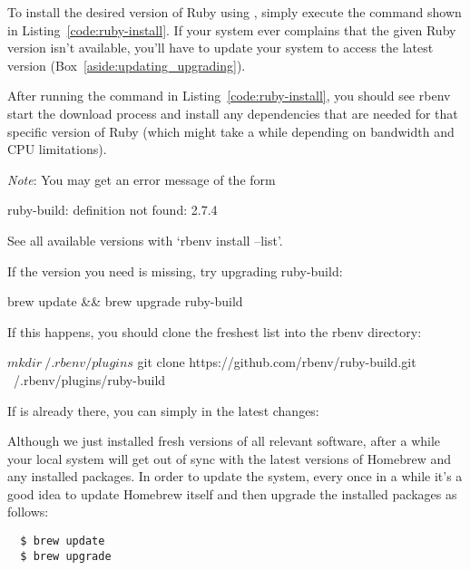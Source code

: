 To install the desired version of Ruby using , simply execute the command shown in Listing~\ref{code:ruby-install}. If your system ever complains that the given Ruby version isn't available, you'll have to update your system to access the latest version (Box~\ref{aside:updating_upgrading}).


\noindent After running the command in Listing~\ref{code:ruby-install}, you should see rbenv start the download process and install any dependencies that are needed for that specific version of Ruby (which might take a while depending on bandwidth and CPU limitations).

\emph{Note}: You may get an error message of the form

\begin{code}
ruby-build: definition not found: 2.7.4

See all available versions with `rbenv install --list'.

If the version you need is missing, try upgrading ruby-build:

  brew update && brew upgrade ruby-build
\end{code}

\noindent If this happens, you should clone the freshest  list into the rbenv  directory:

\begin{code}
$ mkdir ~/.rbenv/plugins
$ git clone https://github.com/rbenv/ruby-build.git ~/.rbenv/plugins/ruby-build
\end{code}

\noindent If  is already there, you can simply  in the latest changes:


\begin{aside}
\label{aside:updating_upgrading}

Although we just installed fresh versions of all relevant software, after a while your local system will get out of sync with the latest versions of Homebrew and any installed packages. In order to update the system, every once in a while it's a good idea to update Homebrew itself and then upgrade the installed packages as follows:

\begin{verbatim}
  $ brew update
  $ brew upgrade
\end{verbatim}

\end{aside}

